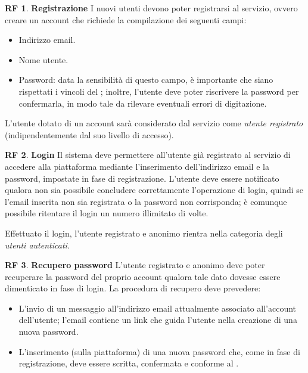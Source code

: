 \documentclass[11pt, a4paper]{article}
\theoremstyle{definition}
\newtheorem{funcreq}{RF} %
\begin{document}
\begin{funcreq}
\label{signup}
\textbf{Registrazione }
I nuovi utenti devono poter registrarsi al servizio, ovvero creare un account che
richiede la compilazione dei seguenti campi:
\begin{itemize}
    \item Indirizzo email.
    \item Nome utente.
    \item Password: data la sensibilità di questo campo, è importante
    che siano rispettati i vincoli del \textcolor{blue}{};
    inoltre, l'utente deve poter riscrivere la password per confermarla, in
    modo tale da rilevare eventuali errori di digitazione.
\end{itemize}
L'utente dotato di un account sarà considerato dal servizio come
\textit{utente registrato} (indipendentemente dal suo livello di accesso).
\end{funcreq}

\begin{funcreq}
\label{login}
\textbf{Login }
Il sistema deve permettere all'utente già registrato al servizio di
accedere alla piattaforma mediante l'inserimento dell'indirizzo
email e la password, impostate in fase di registrazione. L'utente deve
essere notificato qualora non sia possibile concludere correttamente
l'operazione di login, quindi se l'email inserita non sia registrata o
la password non corrisponda; è comunque possibile ritentare il login un
numero illimitato di volte.

Effettuato il login, l'utente registrato e anonimo rientra nella categoria degli
\textit{utenti autenticati}.
\end{funcreq}

\begin{funcreq}
\label{savepassword}
\textbf{Recupero password }
L'utente registrato e anonimo deve poter recuperare la password del proprio account
qualora tale dato dovesse essere dimenticato in fase di login. La procedura
di recupero deve prevedere:
\begin{itemize}
    \item L'invio di un messaggio all'indirizzo email attualmente associato
    all'account dell'utente; l'email contiene un link che guida l'utente
    nella creazione di una nuova password.

    \item L'inserimento (sulla piattaforma) di una nuova password che,
    come in fase di registrazione, deve essere scritta, confermata e
    conforme al \textcolor{blue}{}.
\end{itemize}
\end{funcreq}
\end{document}
